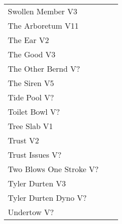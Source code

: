 \begin{center}
\begin{supertabular}{llr}
Swollen Member V3&& \pageref{rt:Swollen Member} \\
The Arboretum V11&& \pageref{rt:The Arboretum} \\
The Ear V2&    & \pageref{rt:The Ear} \\
The Good V3&   & \pageref{rt:The Good} \\
The Other Bernd V?&& \pageref{rt:The Other Bernd} \\
The Siren V5&     & \pageref{rt:The Siren} \\
Tide Pool V?&& \pageref{rt:Tide Pool} \\
Toilet Bowl V?&& \pageref{rt:Toilet Bowl} \\
Tree Slab V1&   & \pageref{rt:Tree Slab} \\
Trust V2&    & \pageref{rt:Trust} \\
Trust Issues V?&& \pageref{rt:Trust Issues} \\
Two Blows One Stroke V?&& \pageref{rt:Two Blows One Stroke} \\
Tyler Durten V3& & \pageref{rt:Tyler Durten} \\
Tyler Durten Dyno V?&& \pageref{vr:Tyler Durten Dyno} \\
Undertow V?&& \pageref{rt:Undertow} \\
\end{supertabular}
\end{center}
